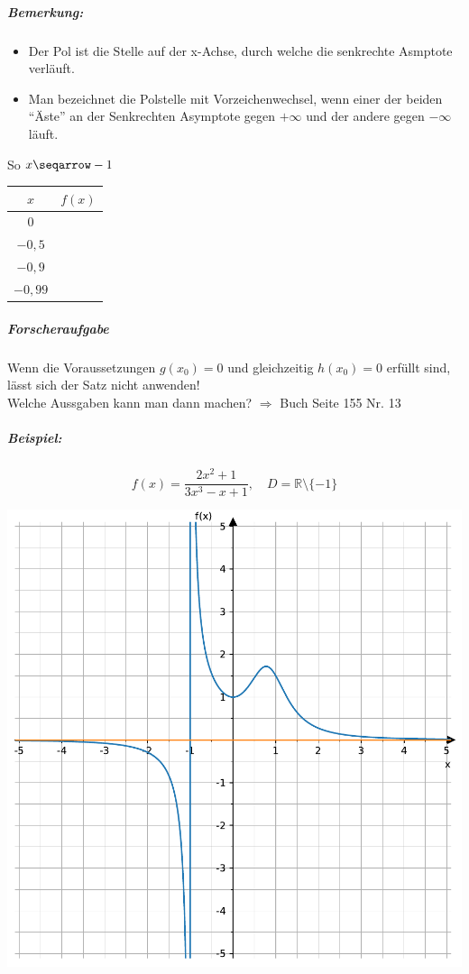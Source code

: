 \documentclass[
  letterpaper,
  DIV=11,
  numbers=noendperiod]{scrartcl}
\let\oldsubparagraph\subparagraph
\renewcommand{\subparagraph}[1]{\oldsubparagraph{#1}\mbox{}}
\providecommand{\tightlist}{%
  \setlength{\itemsep}{0pt}\setlength{\parskip}{0pt}}\usepackage{longtable,booktabs,array}
\begin{document}
\subparagraph{Bemerkung:}\label{bemerkung}

\begin{itemize}
\tightlist
\item
  Der Pol ist die Stelle auf der x-Achse, durch welche die senkrechte
  Asmptote verläuft.
\item
  Man bezeichnet die Polstelle mit Vorzeichenwechsel, wenn einer der
  beiden ``Äste'' an der Senkrechten Asymptote gegen \(+ \infty\) und
  der andere gegen \(-\infty\) läuft.
\end{itemize}

So \(x\seqarrow -1\)

\begin{longtable}[]{@{}cc@{}}
\toprule\noalign{}
\(x\) & \(f(x)\) \\
\midrule\noalign{}
\endhead
\bottomrule\noalign{}
\endlastfoot
\(0\) & \\
\(-0,5\) & \\
\(-0,9\) & \\
\(-0,99\) & \\
\end{longtable}

\subparagraph{Forscheraufgabe}\label{forscheraufgabe}

Wenn die Voraussetzungen \(g(x_0)=0\) und gleichzeitig \(h(x_0)=0\)
erfüllt sind, lässt sich der Satz nicht anwenden!\\
Welche Aussgaben kann man dann machen? \(\Rightarrow\) Buch Seite 155
Nr. 13

\subparagraph{Beispiel:}\label{beispiel-2}

\[
f(x)=\frac{2x^2+1}{3x^3-x+1}, \quad D=\mathbb{R} \setminus \{ -1\} 
 \]

\includegraphics{5_Asymptoten_files/figure-pdf/cell-3-output-1.pdf}
\end{document}
